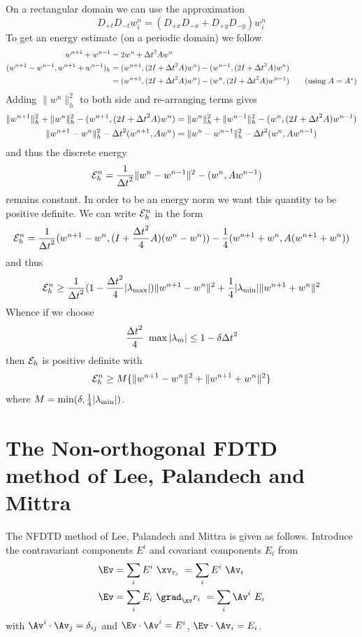 \documentclass[10pt]{article}
\begin{document}
On a rectangular domain we can use the approximation
\[
   D_{+t}D_{-t} w_i^n = (D_{+x}D_{-x}+D_{+y}D_{-y}) w_i^n
\]
To get an energy estimate (on a periodic domain) we follow\cite{KreissPeterssonYstrom2002}
\begin{align*}
  w^{n+1} + w^{n-1} &= 2 w^n + {\Delta t}^2 A w^n \\
 (w^{n+1} - w^{n-1}, w^{n+1} + w^{n-1} )_h &= (w^{n+1},(2I+{\Delta t}^2 A)w^n) - (w^{n-1},(2I+{\Delta t}^2 A)w^n) \\
                 &= (w^{n+1},(2I+{\Delta t}^2 A)w^n) - (w^{n},(2I+{\Delta t}^2 A)w^{n-1})  \qquad\mbox{(using $A=A^*$)} 
\end{align*}
Adding $\| w^{n} \|_h^2$ to both side and re-arranging terms gives
\begin{align*}
  \| w^{n+1} \|_h^2 + \| w^{n} \|_h^2 - (w^{n+1},(2I+{\Delta t}^2 A)w^n)
            &= \| w^{n} \|_h^2 + \| w^{n-1} \|_h^2 - (w^{n},(2I+{\Delta t}^2 A)w^{n-1}) \\
  \| w^{n+1}- w^{n} \|_h^2 - {\Delta t}^2 (w^{n+1},A w^n) &= \| w^{n}- w^{n-1} \|_h^2 - {\Delta t}^2 (w^{n},A w^{n-1})
\end{align*}
and thus the discrete energy
\begin{align*}
  {\cal E}_h^n  &= {1\over {\Delta t}^2} \| w^{n}-w^{n-1}\|^2 - (w^{n},A w^{n-1})
\end{align*}
remains constant. 
In order to be an energy norm we want this quantity to be positive definite.
We can write ${\cal E}_h^n$ in the form
\[
 {\cal E}_h^n  = {1\over {\Delta t}^2} (w^{n+1}- w^{n},(I+{{\Delta t}^2\over4} A)(w^n- w^{n})) 
                 - {1\over4}(w^{n+1}+ w^{n}, A(w^{n+1}+ w^{n})) 
\]
and thus 
\[
 {\cal E}_h^n  \ge {1\over {\Delta t}^2} (1-{{\Delta t}^2\over4}|\lambda_{\rm max}|)\|w^{n+1}- w^{n}\|^2
                 +{1\over4} |\lambda_{\rm min}| \| w^{n+1}+ w^{n} \|^2 
\]  
Whence if we choose 
\[
  {{\Delta t}^2 \over4} ~\max |\lambda_m| \le 1 - \delta{{\Delta t}^2}
\]
then ${\cal E}_h$ is positive definite with 
\[
    {\cal E}_h^n  \ge M \{ \|w^{n+1}- w^{n}\|^2 + \| w^{n+1}+ w^{n} \|^2 \} 
\]
where $M=\min( \delta, {1\over4} |\lambda_{\rm min}| )$.


\clearpage
\section{The Non-orthogonal FDTD method of Lee, Palandech and Mittra}

The NFDTD method of Lee, Palandech and Mittra\cite{Lee92} is given as follows.
Introduce the contravariant components $E^i$ and covariant components $E_i$ from 
\begin{align*}
     \Ev &= \sum_i E^i ~\xv_{r_i} ~= \sum_i E^i ~\Av_i \\
     \Ev &= \sum_i E_i ~\grad_\xv r_i ~= \sum_i \Av^i ~E_i 
\end{align*}
with $\Av^i\cdot\Av_j = \delta_{ij}$ and $\Ev\cdot\Av^i = E^i$, $\Ev\cdot\Av_i = E_i$.
\end{document}
